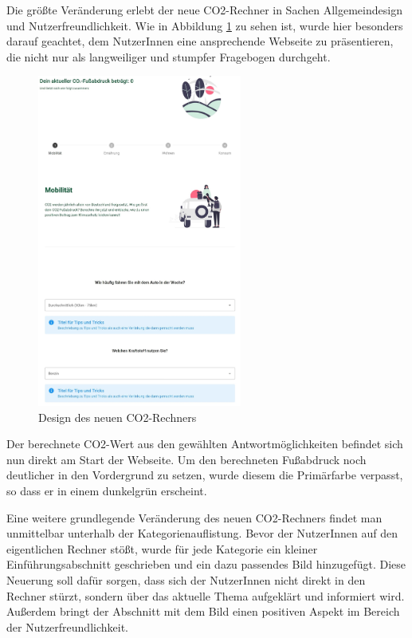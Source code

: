 Die größte Veränderung erlebt der neue CO2-Rechner in Sachen Allgemeindesign und Nutzerfreundlichkeit.
Wie in Abbildung \ref{fig:new-co2runter-calculator-design} zu sehen ist, wurde hier besonders darauf geachtet, dem NutzerInnen eine ansprechende Webseite zu präsentieren, die nicht nur als langweiliger und stumpfer Fragebogen durchgeht.

\begin{figure}[H]
    \centering
    \includegraphics[width=0.6\textwidth]{images/06/Calculator-New-Design.jpeg}
    \caption{Design des neuen CO2-Rechners}
    \label{fig:new-co2runter-calculator-design}
\end{figure}

Der berechnete CO2-Wert aus den gewählten Antwortmöglichkeiten befindet sich nun direkt am Start der Webseite.
Um den berechneten Fußabdruck noch deutlicher in den Vordergrund zu setzen, wurde diesem die Primärfarbe verpasst, so dass er in einem dunkelgrün erscheint.

Eine weitere grundlegende Veränderung des neuen CO2-Rechners findet man unmittelbar unterhalb der Kategorienauflistung.
Bevor der NutzerInnen auf den eigentlichen Rechner stößt, wurde für jede Kategorie ein kleiner Einführungsabschnitt geschrieben und ein dazu passendes Bild hinzugefügt.
Diese Neuerung soll dafür sorgen, dass sich der NutzerInnen nicht direkt in den Rechner stürzt, sondern über das aktuelle Thema aufgeklärt und informiert wird.
Außerdem bringt der Abschnitt mit dem Bild einen positiven Aspekt im Bereich der Nutzerfreundlichkeit.

